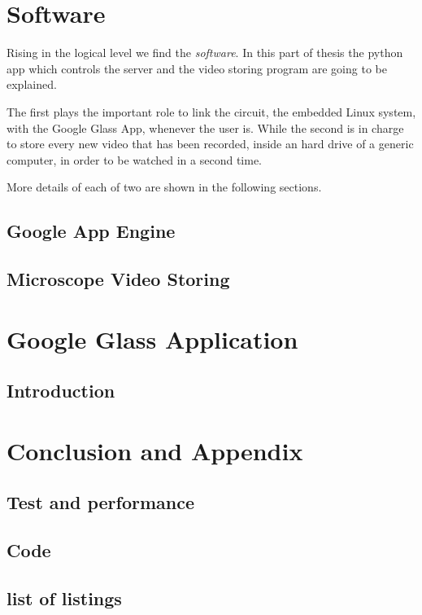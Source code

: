\documentclass[a4paper,12pt,openany,twoside, abstracton]{book}%
\makeatletter
\newcommand*{\lolnoheading}{\@starttoc{lol}}
\makeatother
\begin{document}
\part{Software}
Rising in the logical level we find the \textit{software}. In this part of thesis the python app which controls the server and the video storing program are going to be explained.

The first plays the important role to link the circuit, the embedded Linux system, with the Google Glass App, whenever the user is. While the second is in charge to store every new video that has been recorded, inside an hard drive of a generic computer, in order to be watched in a second time.  

More details of each of two are shown in the following sections.
\chapter{Google App Engine}

\chapter{Microscope Video Storing}
\part{Google Glass Application}
\clearpage
\chapter{Introduction}\label{ch:IIIintroduction}


\clearpage
\part{Conclusion and Appendix}
\chapter{Test and performance}\label{sec:Perf}


\appendix
\chapter{Code}


\cite{SNOA529A}

\clearpage
\listoffigures
{}
\clearpage
\chapter*{list of listings}
\lolnoheading

%






\end{document}
